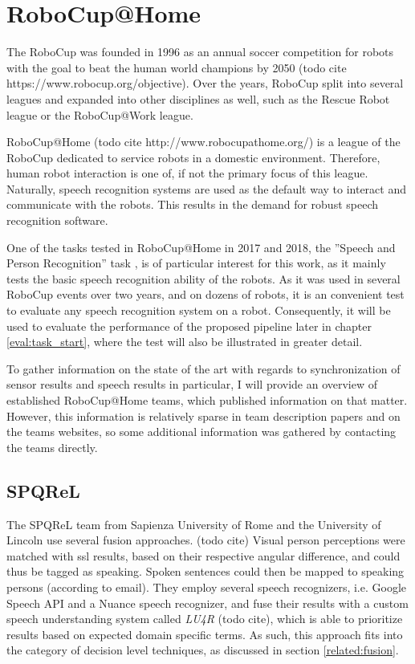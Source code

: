 
\section{RoboCup@Home}
\label{related:robocup}
The RoboCup was founded in 1996 as an annual soccer competition for robots with the goal to beat the human world champions by 2050 (todo cite https://www.robocup.org/objective).
Over the years, RoboCup split into several leagues and expanded into other disciplines as well, such as the Rescue Robot league or the RoboCup@Work league.

RoboCup@Home (todo cite http://www.robocupathome.org/) is a league of the RoboCup dedicated to service robots in a domestic environment. %
Therefore, human robot interaction is one of, if not the primary focus of this league.
Naturally, speech recognition systems are used as the default way to interact and communicate with the robots.
This results in the demand for robust speech recognition software.%

One of the tasks tested in RoboCup@Home in 2017 and 2018, the ''Speech and Person Recognition'' task \cite{rulebook_2018}, is of particular interest for this work, as it mainly tests the basic speech recognition ability of the robots. 
As it was used in several RoboCup events over two years, and on dozens of robots, it is an convenient test to evaluate any speech recognition system on a robot.
Consequently, it will be used to evaluate the performance of the proposed pipeline later in chapter \ref{eval:task_start}, where the test will also be illustrated in greater detail. 

To gather information on the state of the art with regards to synchronization of sensor results and speech results in particular, I will provide an overview of established RoboCup@Home teams, which published information on that matter.
However, this information is relatively sparse in team description papers and on the teams websites, so some additional information was gathered by contacting the teams directly.

\subsection{SPQReL}
The SPQReL team from Sapienza University of Rome and the University of Lincoln use several fusion approaches. (todo cite)
Visual person perceptions were matched with \gls{ssl} results, based on their respective angular difference, and could thus be tagged as speaking.
Spoken sentences could then be mapped to speaking persons (according to email).
They employ several speech recognizers, i.e. Google Speech API and a Nuance speech recognizer, and fuse their results with a custom speech understanding system called \textit{LU4R} (todo cite), which is able to prioritize results based on expected domain specific terms. 
As such, this approach fits into the category of decision level techniques, as discussed in section \ref{related:fusion}.

